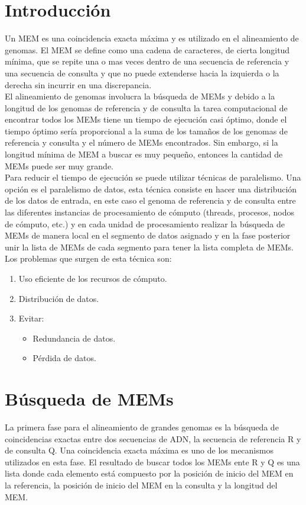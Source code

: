 \documentclass[12pt]{article}
\begin{document}
\maketitle

\section{Introducci\'on}
Un MEM es una coincidencia exacta máxima y es utilizado en el alineamiento de genomas. El MEM se define como una cadena de caracteres, de cierta longitud mínima, que se repite una o mas veces dentro de una secuencia de referencia y una secuencia de consulta y que no puede extenderse hacia la izquierda o la derecha sin incurrir en una discrepancia.\\
El alineamiento de genomas involucra la búsqueda de MEMs y debido a la longitud de los genomas de referencia y de consulta la tarea computacional de encontrar todos los MEMs tiene un tiempo de ejecución casi óptimo, donde el tiempo óptimo sería proporcional a la suma de los tamaños de los genomas de referencia y consulta y el número de MEMs encontrados. Sin embargo, si la longitud mínima de MEM a buscar es muy pequeño, entonces la cantidad de MEMs puede ser muy grande.\\
Para reducir el tiempo de ejecución se puede utilizar técnicas de paralelismo. Una opción es el paralelismo de datos, esta t\'ecnica consiste en hacer una distribución de los datos de entrada, en este caso el genoma de referencia y de consulta entre las diferentes instancias de procesamiento de cómputo (threads, procesos, nodos de cómputo, etc.) y en cada unidad de procesamiento realizar la búsqueda de MEMs de manera local en el segmento de datos asignado y en la fase posterior unir la lista de MEMs de cada segmento para tener la lista completa de MEMs. Los problemas que surgen de esta t\'ecnica son:
\begin{enumerate}
  \item Uso eficiente de los recursos de cómputo.
  \item Distribución de datos.
  \item Evitar:
    \begin{itemize}
      \item Redundancia de datos.
      \item P\'erdida de datos.
    \end{itemize}
\end{enumerate}
\section{Búsqueda de MEMs}
La primera fase para el alineamiento de grandes genomas es la búsqueda de coincidencias exactas entre dos secuencias de ADN, la secuencia de referencia R y de consulta Q. Una coincidencia exacta máxima es uno de los mecanismos utilizados en esta fase. El resultado de buscar todos los MEMs ente R y Q es una lista donde cada elemento está compuesto por la posición de inicio del MEM en la referencia, la posición de inicio del MEM en la consulta y la longitud del MEM.
\end{document}
